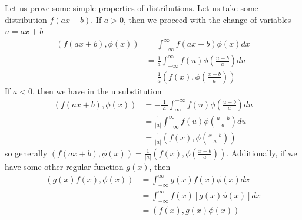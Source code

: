 \documentclass{article}
\theoremstyle{definition}
\begin{document}
Let us prove some simple properties of distributions. Let us take some distribution $f(ax+b)$. If $a>0$, then we proceed with the change of variables $u=ax+b$ \begin{equation*}
    \begin{split}
        (f(ax+b),\phi(x)) &= \int^\infty_{-\infty} f(ax+b) \phi (x)dx \\
        &= \frac{1}{a}\int^\infty_{-\infty} f(u) \phi\left( \frac{u-b}{a} \right) du \\
        &= \frac{1}{a}\left(f(x), \phi\left( \frac{x-b}{a} \right) \right)
    \end{split}
\end{equation*}
If $a<0$, then we have in the u substitution 
\begin{equation*}
    \begin{split}
        (f(ax+b), \phi(x)) &= -\frac{1}{|a|}\int^{-\infty}_{\infty} f(u) \phi \left( \frac{u-b}{a} \right) du \\ &=\frac{1}{|a|} \int^\infty_{-\infty} f(u) \phi \left( \frac{u-b}{a} \right) du \\
        &= \frac{1}{|a|} \left(f(x), \phi\left( \frac{x-b}{a} \right) \right)
    \end{split}
\end{equation*}
so generally $(f(ax+b),\phi(x)) =\frac{1}{|a|}\left(f(x), \phi\left( \frac{x-b}{a} \right) \right)$. Additionally, if we have some other regular function $g(x)$, then 
\begin{equation*}
    \begin{split}
        (g(x)f(x),\phi(x)) &= \int^\infty_{-\infty} g(x)f(x)\phi(x) dx \\
        &= \int^\infty_{-\infty} f(x) [g(x)\phi(x)]dx\\
        &= (f(x),g(x)\phi(x))
    \end{split}
\end{equation*}
\end{document}
